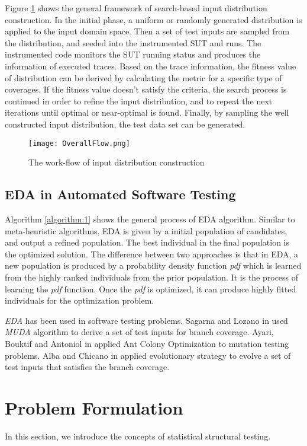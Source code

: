 \documentclass[journal]{IEEEtran}
\begin{document}
Figure \ref{fig:flow} shows the general framework of search-based input distribution construction. In the initial phase, a uniform or randomly generated distribution is applied to the input domain space. Then a set of test inputs are sampled from the distribution, and seeded into the instrumented SUT and runs. The instrumented code monitors the SUT running status and produces the information of executed traces. Based on the trace information, the fitness value of distribution can be derived by calculating the metric for a specific type of coverages. If the fitness value doesn't satisfy the criteria, the search process is continued in order to refine the input distribution, and to repeat the next iterations until optimal or near-optimal is found. Finally, by sampling the well constructed input distribution, the test data set can be generated.
\begin{figure}[t]
	\hspace*{0.5cm}
	\texttt{[image: OverallFlow.png]}
	\caption{The work-flow of input distribution construction}
	\label{fig:flow}
\end{figure}
\subsection{EDA in Automated Software Testing}
Algorithm \ref{algorithm:1} shows the general process of EDA algorithm. Similar to meta-heuristic algorithms, EDA is given by a initial population of candidates, and output a refined population. The best individual in the final population is the optimized solution. The difference between two approaches is that in EDA, a new population is produced by a probability density function \emph{pdf} which is learned from the highly ranked individuals from the prior population. It is the process of learning the \emph{pdf} function. Once the \emph{pdf} is optimized, it can produce highly fitted individuals for the optimization problem.

\emph{EDA} has been used in software testing problems. Sagarna and Lozano in \cite{eda1} used \emph{MUDA} algorithm to derive a set of test inputs for branch coverage. Ayari, Bouktif and Antoniol in \cite{eda2} applied Ant Colony Optimization to mutation testing problems. Alba and Chicano in \cite{sut} applied evolutionary strategy to evolve a set of test inputs that satisfies the branch coverage.  
\section{Problem Formulation}
In this section, we introduce the concepts of statistical structural testing. 
\end{document}
